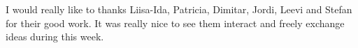\documentclass[12pt, sumlimits, intlimits]{article}
\begin{document}
I would really like to thanks Liisa-Ida, Patricia, Dimitar,  Jordi, Leevi  and  Stefan for their good work.
It was really nice to see them interact and freely exchange ideas during this week.

\clearpage

\thispagestyle{empty}


\printbibliography
%  
%   
\end{document}
